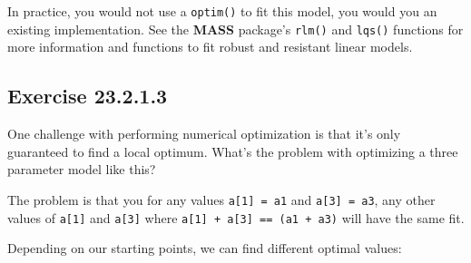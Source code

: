 \documentclass[]{book}
\newenvironment{Shaded}{\begin{snugshade}}{\end{snugshade}}
\newcommand{\CommentTok}[1]{\textcolor[rgb]{0.56,0.35,0.01}{\textit{#1}}}
\newcommand{\ControlFlowTok}[1]{\textcolor[rgb]{0.13,0.29,0.53}{\textbf{#1}}}
\newcommand{\DataTypeTok}[1]{\textcolor[rgb]{0.13,0.29,0.53}{#1}}
\newcommand{\DecValTok}[1]{\textcolor[rgb]{0.00,0.00,0.81}{#1}}
\newcommand{\KeywordTok}[1]{\textcolor[rgb]{0.13,0.29,0.53}{\textbf{#1}}}
\newcommand{\NormalTok}[1]{#1}
\newcommand{\OperatorTok}[1]{\textcolor[rgb]{0.81,0.36,0.00}{\textbf{#1}}}
\newcommand{\StringTok}[1]{\textcolor[rgb]{0.31,0.60,0.02}{#1}}
\theoremstyle{plain}
\theoremstyle{remark}
\begin{document}
In practice, you would not use a \texttt{optim()} to fit this model, you
would you an existing implementation. See the \textbf{MASS} package's
\texttt{rlm()} and \texttt{lqs()} functions for more information and
functions to fit robust and resistant linear models.

\hypertarget{exercise-23.2.1.3}{%
\subsection*{\texorpdfstring{Exercise
{23.2.1.3}}{Exercise 23.2.1.3}}\label{exercise-23.2.1.3}}

One challenge with performing numerical optimization is that it's only
guaranteed to find a local optimum. What's the problem with optimizing a
three parameter model like this?

\begin{Shaded}
\end{Shaded}

The problem is that you for any values \texttt{a{[}1{]}\ =\ a1} and
\texttt{a{[}3{]}\ =\ a3}, any other values of \texttt{a{[}1{]}} and
\texttt{a{[}3{]}} where \texttt{a{[}1{]}\ +\ a{[}3{]}\ ==\ (a1\ +\ a3)}
will have the same fit.

\begin{Shaded}
\end{Shaded}

Depending on our starting points, we can find different optimal values:

\begin{Shaded}
\end{Shaded}
\end{document}
